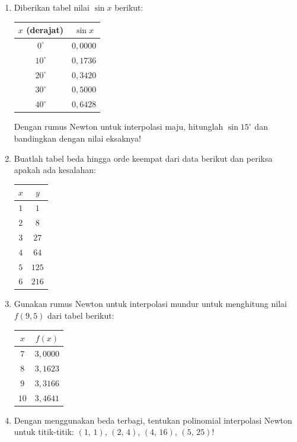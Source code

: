 \begin{enumerate}
  \item Diberikan tabel nilai $\sin x$ berikut:
  \begin{center}
  \begin{tabular}{|c|c|}
  \hline
  $x$ (derajat) & $\sin x$ \\ \hline
  $0^\circ$ & $0{,}0000$ \\
  $10^\circ$ & $0{,}1736$ \\
  $20^\circ$ & $0{,}3420$ \\
  $30^\circ$ & $0{,}5000$ \\
  $40^\circ$ & $0{,}6428$ \\ \hline
  \end{tabular}
  \end{center}
  Dengan rumus Newton untuk interpolasi maju, hitunglah $\sin 15^\circ$ dan bandingkan dengan nilai eksaknya!

  \item Buatlah tabel beda hingga orde keempat dari data berikut dan periksa apakah ada kesalahan:
  \begin{center}
  \begin{tabular}{|c|c|}
  \hline
  $x$ & $y$ \\ \hline
  $1$ & $1$ \\
  $2$ & $8$ \\
  $3$ & $27$ \\
  $4$ & $64$ \\
  $5$ & $125$ \\
  $6$ & $216$ \\ \hline
  \end{tabular}
  \end{center}

  \item Gunakan rumus Newton untuk interpolasi mundur untuk menghitung nilai $f(9{,}5)$ dari tabel berikut:
  \begin{center}
  \begin{tabular}{|c|c|}
  \hline
  $x$ & $f(x)$ \\ \hline
  $7$ & $3{,}0000$ \\
  $8$ & $3{,}1623$ \\
  $9$ & $3{,}3166$ \\
  $10$ & $3{,}4641$ \\ \hline
  \end{tabular}
  \end{center}

  \item Dengan menggunakan beda terbagi, tentukan polinomial interpolasi Newton untuk titik-titik: $(1,\,1)$, $(2,\,4)$, $(4,\,16)$, $(5,\,25)$!
\end{enumerate}
